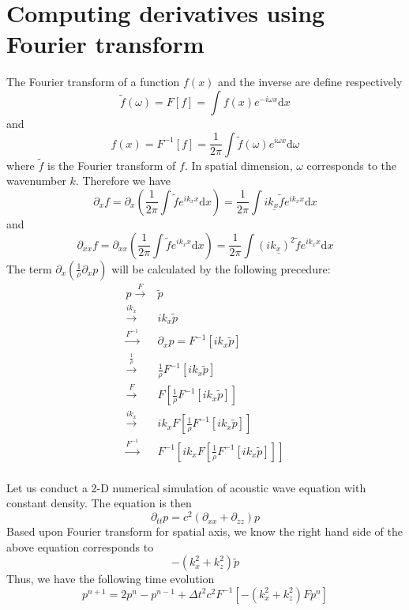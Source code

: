 \section{Computing derivatives using Fourier transform}

The Fourier transform of a function $f(x)$ and the inverse are define respectively
\begin{equation}
 \tilde{f}(\omega)=F[f]=\int f(x)e^{-i\omega x}\mathrm{d}x
\end{equation}
and 
\begin{equation}
 f(x)=F^{-1}[f]=\frac{1}{2\pi}\int \tilde{f}(\omega)e^{i\omega x}\mathrm{d}\omega
\end{equation} 
where $\tilde{f}$ is the Fourier transform of $f$. In spatial dimension, $\omega$ corresponds to the wavenumber $k$. Therefore we have
\begin{equation}
 \partial_x f=\partial_x\left( \frac{1}{2\pi}\int \tilde{f}e^{ik_x x}\mathrm{d}x\right)
= \frac{1}{2\pi}\int \underline{ik_x\tilde{f}}e^{ik_x x}\mathrm{d}x
\end{equation}
and 
\begin{equation}
 \partial_{xx} f=\partial_{xx}\left( \frac{1}{2\pi}\int \tilde{f}e^{ik_x x}\mathrm{d}x\right)
= \frac{1}{2\pi}\int \underline{(ik_x)^2\tilde{f}}e^{ik_x x}\mathrm{d}x
\end{equation}
The term $\partial_x\left(\frac{1}{\rho}\partial_x p\right)$ will be calculated by the following precedure:
\begin{equation}
\begin{array}{rl}
 p\stackrel{F}{\longrightarrow}& \tilde{p}\\
 \stackrel{ik_x}{\longrightarrow} &ik_x\tilde{p}\\
 \stackrel{F^{-1}}{\longrightarrow} &\partial_x p= F^{-1}[ik_x\tilde{p}]\\
 \stackrel{\frac{1}{\rho}}{\rightarrow} &\frac{1}{\rho}F^{-1}[ik_x\tilde{p}]\\
 \stackrel{F}{\rightarrow} & F[\frac{1}{\rho}F^{-1}[ik_x\tilde{p}]]\\
 \stackrel{ik_x}{\rightarrow} & ik_xF[\frac{1}{\rho}F^{-1}[ik_x\tilde{p}]]\\
 \stackrel{F^{-1}}{\rightarrow}& F^{-1}[ik_xF[\frac{1}{\rho}F^{-1}[ik_x\tilde{p}]]] \\
\end{array}
\end{equation}

Let us conduct a 2-D numerical simulation of acoustic wave equation with constant density. The equation is then
\begin{equation}
\partial_{tt}p=c^2 (\partial_{xx}+\partial_{zz})p
\end{equation}
Based upon Fourier transform for spatial axis, we know the right hand side of the above equation corresponds to 
\begin{equation}
-(k_x^2+k_z^2)\tilde{p}
\end{equation}
Thus, we have the following time evolution 
\begin{equation}
p^{n+1}=2p^n-p^{n-1}+\Delta t^2 c^2F^{-1}[-(k_x^2+k_z^2)F p^n]
\end{equation}

